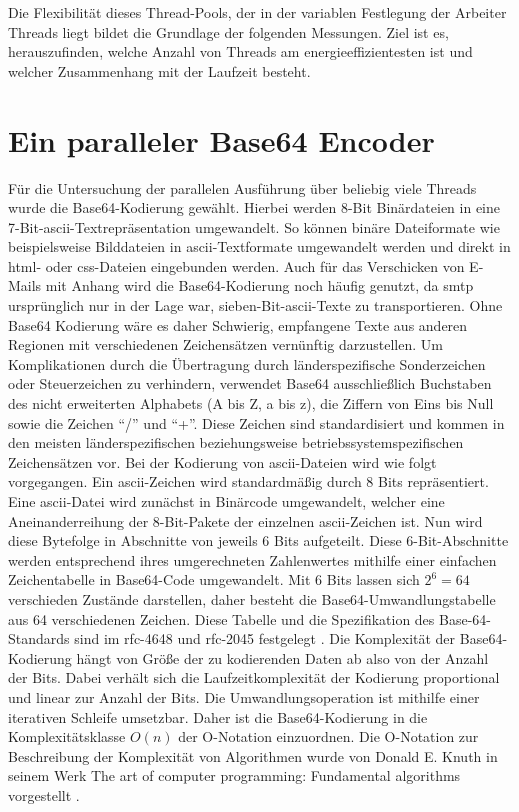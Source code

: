 Die Flexibilität dieses Thread-Pools, der in der variablen Festlegung der Arbeiter Threads liegt bildet die Grundlage der folgenden Messungen. Ziel ist es, herauszufinden, welche Anzahl von Threads am energieeffizientesten ist und welcher Zusammenhang mit der Laufzeit besteht.

\section{Ein paralleler Base64 Encoder}

Für die Untersuchung der parallelen Ausführung über beliebig viele Threads wurde die Base64-Kodierung gewählt. Hierbei werden 8-Bit Binärdateien in eine 7-Bit-\ac{ascii}-Textrepräsentation umgewandelt. So können binäre Dateiformate wie beispielsweise Bilddateien in \ac{ascii}-Textformate umgewandelt werden und direkt in \ac{html}- oder \ac{css}-Dateien eingebunden werden. Auch für das Verschicken von E-Mails mit Anhang wird die Base64-Kodierung noch häufig genutzt, da \ac{smtp} ursprünglich nur in der Lage war, sieben-Bit-\ac{ascii}-Texte zu transportieren. Ohne Base64 Kodierung wäre es daher Schwierig, empfangene Texte aus anderen Regionen mit verschiedenen Zeichensätzen vernünftig darzustellen. Um Komplikationen durch die Übertragung durch länderspezifische Sonderzeichen oder Steuerzeichen zu verhindern, verwendet Base64 ausschließlich Buchstaben des nicht erweiterten Alphabets (A bis Z, a bis z), die Ziffern von Eins bis Null sowie die Zeichen \enquote{/} und \enquote{+}. Diese Zeichen sind standardisiert und kommen in den meisten länderspezifischen beziehungsweise betriebssystemspezifischen Zeichensätzen vor. Bei der Kodierung von \ac{ascii}-Dateien wird wie folgt vorgegangen. Ein \ac{ascii}-Zeichen wird standardmäßig durch 8 Bits repräsentiert. Eine \ac{ascii}-Datei wird zunächst in Binärcode umgewandelt, welcher eine Aneinanderreihung der 8-Bit-Pakete der einzelnen \ac{ascii}-Zeichen ist. Nun wird diese Bytefolge in Abschnitte von jeweils 6 Bits aufgeteilt. Diese 6-Bit-Abschnitte werden entsprechend ihres umgerechneten Zahlenwertes mithilfe einer einfachen Zeichentabelle in Base64-Code umgewandelt. Mit 6 Bits lassen sich $2^{ 6 } = 64$ verschieden Zustände darstellen, daher besteht die Base64-Umwandlungstabelle aus 64 verschiedenen Zeichen. Diese Tabelle und die Spezifikation des Base-64-Standards sind im \ac{rfc}-4648 \cite{base64-rfc4648} und \ac{rfc}-2045 festgelegt \cite{base64-rfc2045}. Die Komplexität der Base64-Kodierung hängt von Größe der zu kodierenden Daten ab also von der Anzahl der Bits. Dabei verhält sich die Laufzeitkomplexität der Kodierung proportional und linear zur Anzahl der Bits. Die Umwandlungsoperation ist mithilfe einer iterativen Schleife umsetzbar. Daher ist die Base64-Kodierung in die Komplexitätsklasse $O(n)$ der O-Notation einzuordnen. Die O-Notation zur Beschreibung der Komplexität von Algorithmen wurde von Donald E. Knuth in seinem Werk \glqq The art of computer programming: Fundamental algorithms\grqq{} vorgestellt \cite[107]{knuth1} .

